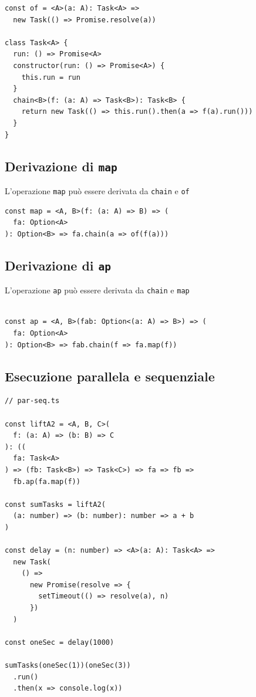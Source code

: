 \documentclass[12pt]{article}
\begin{document}
\begin{verbatim}
const of = <A>(a: A): Task<A> =>
  new Task(() => Promise.resolve(a))

class Task<A> {
  run: () => Promise<A>
  constructor(run: () => Promise<A>) {
    this.run = run
  }
  chain<B>(f: (a: A) => Task<B>): Task<B> {
    return new Task(() => this.run().then(a => f(a).run()))
  }
}
\end{verbatim}

\subsection{Derivazione di \texttt{map}}

L'operazione \texttt{map} può essere derivata da \texttt{chain} e \texttt{of}

\begin{verbatim}
const map = <A, B>(f: (a: A) => B) => (
  fa: Option<A>
): Option<B> => fa.chain(a => of(f(a)))
\end{verbatim}

\subsection{Derivazione di \texttt{ap}}

L'operazione \texttt{ap} può essere derivata da \texttt{chain} e \texttt{map}

\begin{verbatim}

const ap = <A, B>(fab: Option<(a: A) => B>) => (
  fa: Option<A>
): Option<B> => fab.chain(f => fa.map(f))
\end{verbatim}

\subsection{Esecuzione parallela e sequenziale}

\begin{verbatim}
// par-seq.ts

const liftA2 = <A, B, C>(
  f: (a: A) => (b: B) => C
): ((
  fa: Task<A>
) => (fb: Task<B>) => Task<C>) => fa => fb =>
  fb.ap(fa.map(f))

const sumTasks = liftA2(
  (a: number) => (b: number): number => a + b
)

const delay = (n: number) => <A>(a: A): Task<A> =>
  new Task(
    () =>
      new Promise(resolve => {
        setTimeout(() => resolve(a), n)
      })
  )

const oneSec = delay(1000)

sumTasks(oneSec(1))(oneSec(3))
  .run()
  .then(x => console.log(x))
\end{verbatim}
\end{document}
